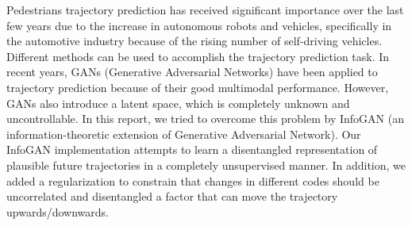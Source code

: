 Pedestrians trajectory prediction has received significant importance over the last few years due to the increase in autonomous robots and vehicles, specifically in the automotive industry because of the rising number of self-driving vehicles. Different methods can be used to accomplish the trajectory prediction task. In recent years, GANs (Generative Adversarial Networks) have been applied to trajectory prediction because of their good multimodal performance. However, GANs also introduce a latent space, which is completely unknown and uncontrollable. In this report, we tried to overcome this problem by InfoGAN (an information-theoretic extension of Generative Adversarial Network). Our InfoGAN implementation attempts to learn a disentangled representation of plausible future trajectories in a completely unsupervised manner. In addition, we added a regularization to constrain that changes in different codes should be uncorrelated and disentangled a factor that can move the trajectory upwards/downwards.
